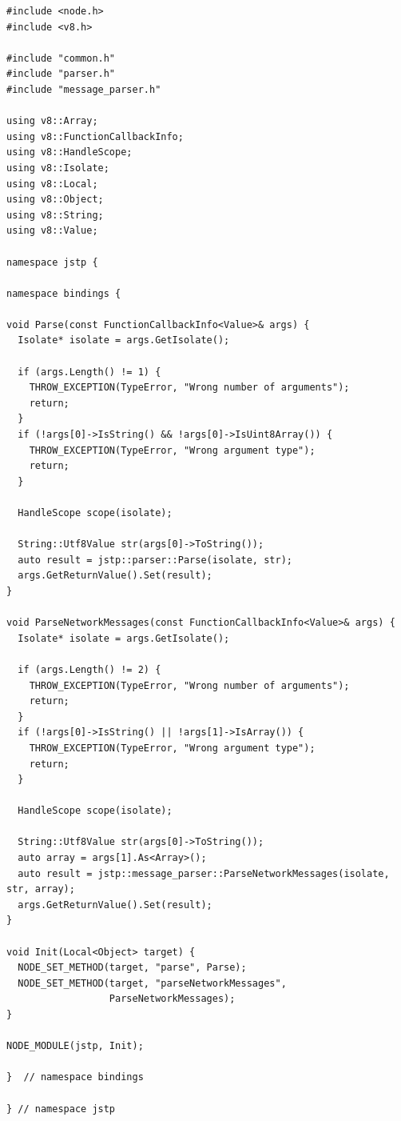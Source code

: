 \documentclass[%
  ukrainian, utf8, columnvii, simple,
  hpadding=10mm, vpadding=10mm, reduceheight=2mm,
  floatsection,
]{eskdtext}
\begin{document}
\begin{verbatim}
#include <node.h>
#include <v8.h>

#include "common.h"
#include "parser.h"
#include "message_parser.h"

using v8::Array;
using v8::FunctionCallbackInfo;
using v8::HandleScope;
using v8::Isolate;
using v8::Local;
using v8::Object;
using v8::String;
using v8::Value;

namespace jstp {

namespace bindings {

void Parse(const FunctionCallbackInfo<Value>& args) {
  Isolate* isolate = args.GetIsolate();

  if (args.Length() != 1) {
    THROW_EXCEPTION(TypeError, "Wrong number of arguments");
    return;
  }
  if (!args[0]->IsString() && !args[0]->IsUint8Array()) {
    THROW_EXCEPTION(TypeError, "Wrong argument type");
    return;
  }

  HandleScope scope(isolate);

  String::Utf8Value str(args[0]->ToString());
  auto result = jstp::parser::Parse(isolate, str);
  args.GetReturnValue().Set(result);
}

void ParseNetworkMessages(const FunctionCallbackInfo<Value>& args) {
  Isolate* isolate = args.GetIsolate();

  if (args.Length() != 2) {
    THROW_EXCEPTION(TypeError, "Wrong number of arguments");
    return;
  }
  if (!args[0]->IsString() || !args[1]->IsArray()) {
    THROW_EXCEPTION(TypeError, "Wrong argument type");
    return;
  }

  HandleScope scope(isolate);

  String::Utf8Value str(args[0]->ToString());
  auto array = args[1].As<Array>();
  auto result = jstp::message_parser::ParseNetworkMessages(isolate, str, array);
  args.GetReturnValue().Set(result);
}

void Init(Local<Object> target) {
  NODE_SET_METHOD(target, "parse", Parse);
  NODE_SET_METHOD(target, "parseNetworkMessages",
                  ParseNetworkMessages);
}

NODE_MODULE(jstp, Init);

}  // namespace bindings

} // namespace jstp
\end{verbatim}
\end{document}
